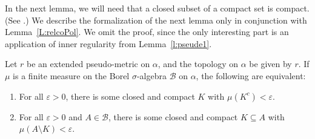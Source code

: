 \documentclass[lean]{DraftAFM}
\begin{document}

In the next lemma, we will need that a closed subset of a compact set
is compact. (See .) We describe
the formalization of the next lemma only in conjunction with
Lemma~\ref{L:relcoPol}. We omit the proof, since the
  only interesting part is an application of inner regularity from
  Lemma~\ref{l:pseude1}.

\begin{lemma}\label{l:tight}
  Let $r$ be an extended pseudo-metric on $\alpha$, and the topology
  on $\alpha$ be given by $r$. If $\mu$ is a finite measure on the
  Borel $\sigma$-algebra $\mathcal B$ on $\alpha$, the following are
  equivalent:
  \begin{enumerate}
    \item For all $\varepsilon>0$, there is some closed and compact
      $K$ with $\mu(K^c) < \varepsilon$.
    \item For all $\varepsilon>0$ and $A \in \mathcal B$, there is
      some closed and compact $K\subseteq A$ with $\mu(A \setminus K)
      < \varepsilon$.
  \end{enumerate}
\end{lemma}


\end{document}
